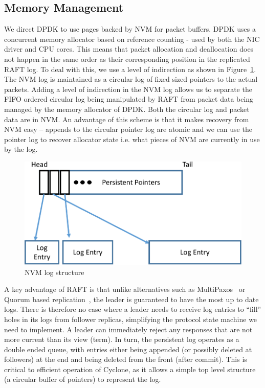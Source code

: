 \documentclass[pageno]{jpaper}
\begin{document}
\subsection{Memory Management}
\label{sec:mm}
We direct DPDK to use pages backed by NVM for packet buffers. DPDK uses a
concurrent memory allocator based on reference counting - used by both the NIC
driver and CPU cores. This means that packet allocation and deallocation does
not happen in the same order as their corresponding position in the replicated
RAFT log. To deal with this, we use a level of indirection as shown in
Figure~\ref{fig:nvm_log}. The NVM log is maintained as a circular log of fixed
sized pointers to the actual packets. Adding a level of indirection in the NVM
log allows us to separate the FIFO ordered circular log being manipulated by
RAFT from packet data being managed by the memory allocator of DPDK. Both the
circular log and packet data are in NVM. An advantage of this scheme is that it
makes recovery from NVM easy -- appends to the circular pointer log are atomic
and we can use the pointer log to recover allocator state i.e. what pieces of
NVM are currently in use by the log.

\begin{figure}
\centering
\includegraphics[scale=0.3]{figures2/nvm_log.pdf}
\caption{NVM log structure}
\label{fig:nvm_log}
\end{figure}

A key advantage of RAFT is that unlike alternatives such as
MultiPaxos~\cite{multipaxos} or Quorum based replication~\cite{quorum}, the
leader is guaranteed to have the most up to date logs. There is therefore no
case where a leader needs to receive log entries to ``fill'' holes in its logs
from follower replicas, simplifying the protocol state machine we need to
implement. A leader can immediately reject any responses that are not more
current than its view (term). In turn, the persistent log operates as a double
ended queue, with entries either being appended (or possibly deleted at
followers) at the end and being deleted from the front (after commit). This is
critical to efficient operation of Cyclone, as it allows a simple top level
structure (a circular buffer of pointers) to represent the log.
\end{document}
